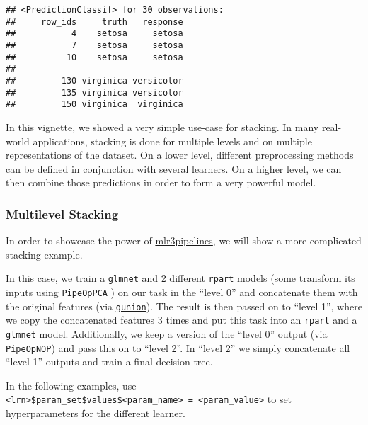 \documentclass[
]{scrbook}
\begin{document}
\begin{verbatim}
## <PredictionClassif> for 30 observations:
##     row_ids     truth   response
##           4    setosa     setosa
##           7    setosa     setosa
##          10    setosa     setosa
## ---                             
##         130 virginica versicolor
##         135 virginica versicolor
##         150 virginica  virginica
\end{verbatim}

In this vignette, we showed a very simple use-case for stacking.
In many real-world applications, stacking is done for multiple levels and on multiple representations of the dataset.
On a lower level, different preprocessing methods can be defined in conjunction with several learners.
On a higher level, we can then combine those predictions in order to form a very powerful model.

\hypertarget{multilevel-stacking}{%
\subsubsection{Multilevel Stacking}\label{multilevel-stacking}}

In order to showcase the power of \href{https://mlr3pipelines.mlr-org.com}{mlr3pipelines}, we will show a more complicated stacking example.

In this case, we train a \texttt{glmnet} and 2 different \texttt{rpart} models (some transform its inputs using \href{https://mlr3pipelines.mlr-org.com/reference/mlr_pipeops_pca.html}{\texttt{PipeOpPCA}} ) on our task in the ``level 0'' and concatenate them with the original features (via \href{https://mlr3pipelines.mlr-org.com/reference/gunion.html}{\texttt{gunion}}).
The result is then passed on to ``level 1'', where we copy the concatenated features 3 times and put this task into an \texttt{rpart} and a \texttt{glmnet} model.
Additionally, we keep a version of the ``level 0'' output (via \href{https://mlr3pipelines.mlr-org.com/reference/mlr_pipeops_nop.html}{\texttt{PipeOpNOP}}) and pass this on to ``level 2''.
In ``level 2'' we simply concatenate all ``level 1'' outputs and train a final decision tree.

In the following examples, use \texttt{\textless{}lrn\textgreater{}\$param\_set\$values\$\textless{}param\_name\textgreater{}\ =\ \textless{}param\_value\textgreater{}} to set hyperparameters
for the different learner.
\end{document}
